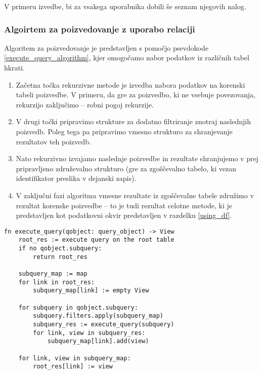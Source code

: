 \documentclass[a4paper,12pt,openright]{book}
\begin{document}
\begin{itemize}
        \noindent
        V primeru izvedbe, bi za vsakega uporabnika dobili še seznam njegovih nalog.

        \subsubsection{Algoirtem za poizvedovanje z uporabo relaciji}
        \label{query_execution}

        Algoritem za poizvedovanje je predstavljen s pomočjo psevdokode \ref{execute_query_algorithm}, kjer omogočamo nabor podatkov iz različnih tabel hkrati.

        \begin{enumerate}
            \item Začetna točka rekurzivne metode je izvedba nabora podatkov na korenski tabeli poizvedbe. V primeru, da gre za poizvedbo, ki ne vsebuje povezovanja, rekurzijo zaključimo – robni pogoj rekurzije.
            \item V drugi točki pripravimo strukture za dodatno filtriranje znotraj naslednjih poizvedb. Poleg tega pa pripravimo vmesno strukturo za shranjevanje rezultatov teh poizvedb.
            \item Nato rekurzivno izvajamo naslednje poizvedbe in rezultate shranjujemo v prej pripravljeno združevalno strukturo (gre za zgoščevalno tabelo, ki vezan identifikator preslika v dejanski zapis).
            \item V zaključni fazi algoritma vmesne rezultate iz zgoščevalne tabele združimo v rezultat korenske poizvedbe – to je tudi rezultat celotne metode, ki je predstavljen kot podatkovni okvir predstavljen v razdelku \ref{using_df}.
        \end{enumerate}

\begin{code}
\begin{verbatim}
fn execute_query(qobject: query_object) -> View
    root_res := execute query on the root table
    if no qobject.subquery:
        return root_res

    subquery_map := map
    for link in root_res:
        subquery_map[link] := empty View

    for subquery in qobject.subquery:
        subquery.filters.apply(subquery_map)
        subquery_res := execute_query(subquery)
        for link, view in subquery_res:
            subquery_map[link].add(view)

    for link, view in subquery_map:
        root_res[link] := view


\end{verbatim}
\end{code}
\end{itemize}
\end{document}
